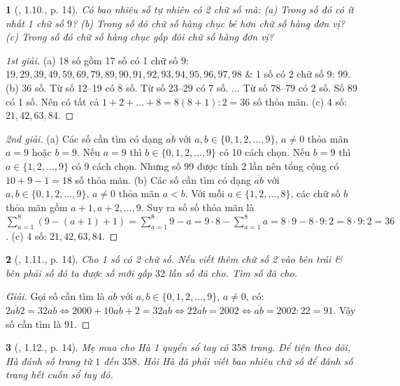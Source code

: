 \documentclass{article}
\newtheorem{baitoan}{}
\begin{document}
\begin{baitoan}[\cite{Binh_boi_duong_Toan_6_tap_1}, 1.10., p. 14]
	Có bao nhiêu số tự nhiên có 2 chữ số mà: (a) Trong số đó có ít nhất 1 chữ số $9$? (b) Trong số đó chữ số hàng chục bé hơn chữ số hàng đơn vị? (c) Trong số đó chữ số hàng chục gấp đôi chữ số hàng đơn vị?
\end{baitoan}

\begin{proof}[1st giải]
	(a) 18 số gồm 17 số có 1 chữ số 9: $19,29,39,49,59,69,79,89,90,91,92,93,94,95,96,97,98$ \& 1 số có 2 chữ số 9: 99. (b) 36 số. Từ số 12--19 có 8 số. Từ số 23--29 có 7 số. $\ldots$ Từ số 78--79 có 2 số. Số 89 có 1 số. Nên có tất cả $1 + 2 + \ldots + 8 = 8(8 + 1):2 = 36$ số thỏa mãn. (c) 4 số: $21,42,63,84$.
\end{proof}

\begin{proof}[2nd giải]
	(a) Các số cần tìm có dạng $\overline{ab}$ với $a,b\in\{0,1,2,\ldots,9\}$, $a\ne0$ thỏa mãn $a = 9$ hoặc $b = 9$. Nếu $a = 9$ thì $b\in\{0,1,2,\ldots,9\}$ có 10 cách chọn. Nếu $b = 9$ thì $a\in\{1,2,\ldots,9\}$ có 9 cách chọn. Nhưng số 99 được tính 2 lần nên tổng cộng có $10 + 9 - 1 = 18$ số thỏa mãn. (b) Các số cần tìm có dạng $\overline{ab}$ với $a,b\in\{0,1,2,\ldots,9\}$, $a\ne0$ thỏa mãn $a < b$. Với mỗi $a\in\{1,2,\ldots,8\}$, các chữ số $b$ thỏa mãn gồm $a + 1,a + 2,\ldots,9$. Suy ra số số thỏa mãn là $\sum_{a=1}^8 (9 - (a + 1) + 1) = \sum_{a=1}^8 9 - a = 9\cdot8 - \sum_{a=1}^8 a = 8\cdot9 - 8\cdot9:2 = 8\cdot9:2 = 36$. (c) 4 số: $21,42,63,84$.
\end{proof}

\begin{baitoan}[\cite{Binh_boi_duong_Toan_6_tap_1}, 1.11., p. 14]
	Cho 1 số có 2 chữ số. Nếu viết thêm chữ số 2 vào bên trái \& bên phải số đó ta được số mới gấp $32$ lần số đã cho. Tìm số đã cho.
\end{baitoan}

\begin{proof}[Giải]
	Gọi số cần tìm là $\overline{ab}$ với $a,b\in\{0,1,2,\ldots,9\}$, $a\ne0$, có: $\overline{2ab2} = 32\overline{ab}\Leftrightarrow2000 + 10\overline{ab} + 2 = 32\overline{ab}\Leftrightarrow22\overline{ab} = 2002\Leftrightarrow\overline{ab} = 2002:22 = 91$. Vậy số cần tìm là 91.
\end{proof}

\begin{baitoan}[\cite{Binh_boi_duong_Toan_6_tap_1}, 1.12., p. 14]
	Mẹ mua cho Hà 1 quyển sổ tay có $358$ trang. Để tiện theo dõi, Hà đánh số trang từ $1$ đến $358$. Hỏi Hà đã phải viết bao nhiêu chữ số để đánh số trang hết cuốn sổ tay đó.
\end{baitoan}
\end{document}
